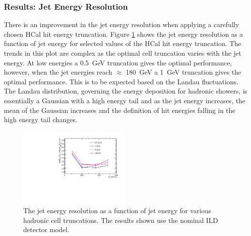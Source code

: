 
\subsubsection{Results: Jet Energy Resolution}
There is an improvement in the jet energy resolution when applying a carefully chosen HCal hit energy truncation.  Figure \ref{fig:jercelltrunc} shows the jet energy resolution as a function of jet energy for selected values of the HCal hit energy truncation.  The trends in this plot are complex as the optimal cell truncation varies with the jet energy.  At low energies a 0.5~GeV truncation gives the optimal performance, however, when the jet energies reach $\approx$ 180~GeV a 1~GeV truncation gives the optimal performance.  This is to be expected based on the Landau fluctuations.  The Landau distribution, governing the energy deposition for hadronic showers, is essentially a Gaussian with a high energy tail and as the jet energy increases, the mean of the Gaussian increases and the definition of hit energies falling in the high energy tail changes.  

\begin{figure}[h!]
\includegraphics[width=0.5\textwidth]{EnergyEstimators/Plots/CellTruncation/JER_vs_JetEnergy_HCalCellTruncation.pdf}
\caption[The jet energy resolution as a function of jet energy for various hadronic cell truncations.  The results shown use the nominal ILD detector model.]{The jet energy resolution as a function of jet energy for various hadronic cell truncations.  The results shown use the nominal ILD detector model.}
\label{fig:jercelltrunc}
\end{figure}

